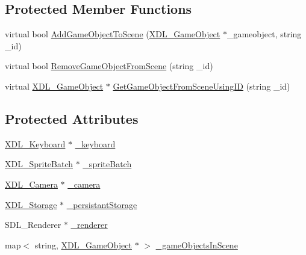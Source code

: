 \subsection*{Protected Member Functions}
\begin{DoxyCompactItemize}
\item 
virtual bool \hyperlink{class_x_d_l___scene_ab8aa77c9d37e13b4e67f0e1989bcb641}{Add\-Game\-Object\-To\-Scene} (\hyperlink{class_x_d_l___game_object}{X\-D\-L\-\_\-\-Game\-Object} $\ast$\-\_\-gameobject, string \-\_\-id)
\item 
virtual bool \hyperlink{class_x_d_l___scene_aa8aea6a87c3dbd2faa52480907f90d62}{Remove\-Game\-Object\-From\-Scene} (string \-\_\-id)
\item 
virtual \hyperlink{class_x_d_l___game_object}{X\-D\-L\-\_\-\-Game\-Object} $\ast$ \hyperlink{class_x_d_l___scene_a542233e544b861b4e41b7ab86a91e122}{Get\-Game\-Object\-From\-Scene\-Using\-I\-D} (string \-\_\-id)
\end{DoxyCompactItemize}
\subsection*{Protected Attributes}
\begin{DoxyCompactItemize}
\item 
\hyperlink{class_x_d_l___keyboard}{X\-D\-L\-\_\-\-Keyboard} $\ast$ \hyperlink{class_x_d_l___scene_abc53fadb79149e2f41de807070093509}{\-\_\-keyboard}
\item 
\hyperlink{class_x_d_l___sprite_batch}{X\-D\-L\-\_\-\-Sprite\-Batch} $\ast$ \hyperlink{class_x_d_l___scene_acd40bb9e62e836e6a10bfd75b53b74b1}{\-\_\-sprite\-Batch}
\item 
\hyperlink{class_x_d_l___camera}{X\-D\-L\-\_\-\-Camera} $\ast$ \hyperlink{class_x_d_l___scene_a9f432061e3a0b2bcf9166abf9000b753}{\-\_\-camera}
\item 
\hyperlink{class_x_d_l___storage}{X\-D\-L\-\_\-\-Storage} $\ast$ \hyperlink{class_x_d_l___scene_add9dee84c2e4a1adc445fa9c81d79fe4}{\-\_\-persistant\-Storage}
\item 
S\-D\-L\-\_\-\-Renderer $\ast$ \hyperlink{class_x_d_l___scene_a923ee55d91647c14f2566f1aa70e3aed}{\-\_\-renderer}
\item 
map$<$ string, \hyperlink{class_x_d_l___game_object}{X\-D\-L\-\_\-\-Game\-Object} $\ast$ $>$ \hyperlink{class_x_d_l___scene_aad1feb840a1c2925324ccce29fa1d3a4}{\-\_\-game\-Objects\-In\-Scene}
\end{DoxyCompactItemize}


